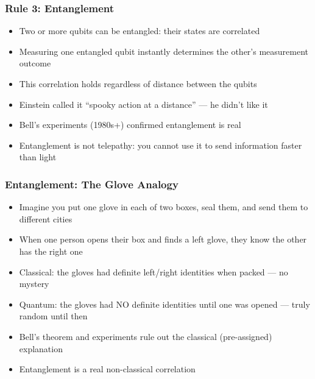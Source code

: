 \begin{frame}[fragile]\frametitle{Rule 3: Entanglement}
\begin{itemize}
\item Two or more qubits can be entangled: their states are correlated
\item Measuring one entangled qubit instantly determines the other's measurement outcome
\item This correlation holds regardless of distance between the qubits
\item Einstein called it ``spooky action at a distance'' --- he didn't like it
\item Bell's experiments (1980s+) confirmed entanglement is real
\item Entanglement is not telepathy: you cannot use it to send information faster than light
\end{itemize}
\end{frame}

\begin{frame}[fragile]\frametitle{Entanglement: The Glove Analogy}
\begin{itemize}
\item Imagine you put one glove in each of two boxes, seal them, and send them to different cities
\item When one person opens their box and finds a left glove, they know the other has the right one
\item Classical: the gloves had definite left/right identities when packed --- no mystery
\item Quantum: the gloves had NO definite identities until one was opened --- truly random until then
\item Bell's theorem and experiments rule out the classical (pre-assigned) explanation
\item Entanglement is a real non-classical correlation
\end{itemize}
\end{frame}

